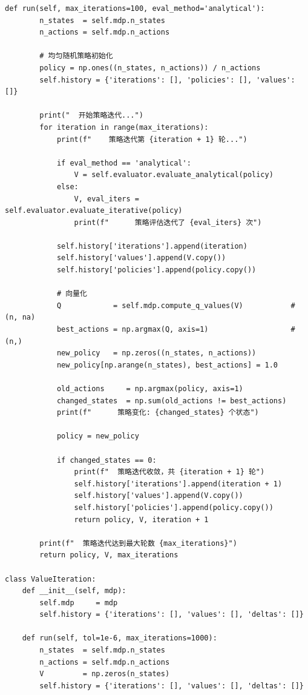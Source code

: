 \documentclass[12pt,a4paper]{article}
\begin{document}
\begin{lstlisting}[caption={策略迭代与值迭代算法完整实现（3.py）}]
    def run(self, max_iterations=100, eval_method='analytical'):
        n_states  = self.mdp.n_states
        n_actions = self.mdp.n_actions

        # 均匀随机策略初始化
        policy = np.ones((n_states, n_actions)) / n_actions
        self.history = {'iterations': [], 'policies': [], 'values': []}

        print("  开始策略迭代...")
        for iteration in range(max_iterations):
            print(f"    策略迭代第 {iteration + 1} 轮...")

            if eval_method == 'analytical':
                V = self.evaluator.evaluate_analytical(policy)
            else:
                V, eval_iters = self.evaluator.evaluate_iterative(policy)
                print(f"      策略评估迭代了 {eval_iters} 次")

            self.history['iterations'].append(iteration)
            self.history['values'].append(V.copy())
            self.history['policies'].append(policy.copy())

            # 向量化
            Q            = self.mdp.compute_q_values(V)           # (n, na)
            best_actions = np.argmax(Q, axis=1)                   # (n,)
            new_policy   = np.zeros((n_states, n_actions))
            new_policy[np.arange(n_states), best_actions] = 1.0

            old_actions     = np.argmax(policy, axis=1)
            changed_states  = np.sum(old_actions != best_actions)
            print(f"      策略变化: {changed_states} 个状态")

            policy = new_policy

            if changed_states == 0:
                print(f"  策略迭代收敛，共 {iteration + 1} 轮")
                self.history['iterations'].append(iteration + 1)
                self.history['values'].append(V.copy())
                self.history['policies'].append(policy.copy())
                return policy, V, iteration + 1

        print(f"  策略迭代达到最大轮数 {max_iterations}")
        return policy, V, max_iterations

class ValueIteration:
    def __init__(self, mdp):
        self.mdp     = mdp
        self.history = {'iterations': [], 'values': [], 'deltas': []}

    def run(self, tol=1e-6, max_iterations=1000):
        n_states  = self.mdp.n_states
        n_actions = self.mdp.n_actions
        V         = np.zeros(n_states)
        self.history = {'iterations': [], 'values': [], 'deltas': []}


\end{lstlisting}
\end{document}
